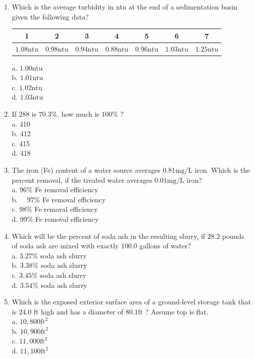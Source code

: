 \documentclass[10pt]{article}
\begin{document}
\begin{enumerate}
\item Which is the average turbidity in ntu at the end of a sedimentation basin given the following data?

\begin{tabular}{|c|c|c|c|c|c|c|}
\hline
1 & 2 & 3 & 4 & 5 & 6 & 7 \\
\hline
$1.08 \mathrm{ntu}$ & $0.98 \mathrm{ntu}$ & $0.94 \mathrm{ntu}$ & $0.88 \mathrm{ntu}$ & $0.96 \mathrm{ntu}$ & $1.03 \mathrm{ntu}$ & $1.25 \mathrm{ntu}$ \\
\hline
\end{tabular}

a. $1.00 \mathrm{ntu}$\\
b. $1.01 \mathrm{ntu}$\\
c. $1.02 \mathrm{ntu}$\\
d. $1.03 \mathrm{ntu}$

  \item If 288 is $70.3 \%$, how much is $100 \%$ ?\\
a. 410\\
b. 412\\
c. 415\\
d. 418

  \item The iron (Fe) content of a water source averages $0.81 \mathrm{mg} / \mathrm{L}$ iron. Which is the percent removal, if the treated water averages $0.01 \mathrm{mg} / \mathrm{L}$ iron?\\
a. $96 \%$ Fe removal efficiency\\
b. $\quad 97 \%$ Fe removal efficiency\\
c. $98 \%$ Fe removal efficiency\\
d. $99 \%$ Fe removal efficiency

  \item Which will be the percent of soda ash in the resulting slurry, if $28.2$ pounds of soda ash are mixed with exactly $100.0$ gallons of water?\\
a. $3.27 \%$ soda ash slurry\\
b. $3.38 \%$ soda ash slurry\\
c. $3.45 \%$ soda ash slurry\\
d. $3.54 \%$ soda ash slurry

  \item Which is the exposed exterior surface area of a ground-level storage tank that is $24.0$ $\mathrm{ft}$ high and has a diameter of $80.1 \mathrm{ft}$ ? Assume top is flat.\\
a. $10,800 \mathrm{ft}^{2}$\\
b. $10,900 \mathrm{ft}^{2}$\\
c. $11,000 \mathrm{ft}^{2}$\\
d. $11,100 \mathrm{ft}^{2}$


\end{enumerate}
\end{document}
